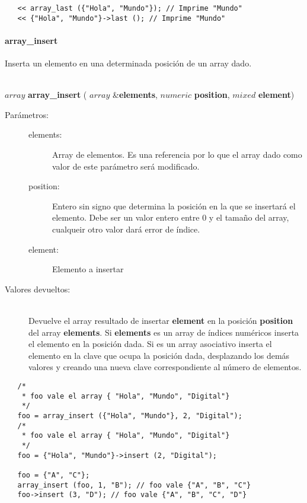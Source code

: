 \begin{lstlisting}   
   << array_last ({"Hola", "Mundo"}); // Imprime "Mundo"
   << {"Hola", "Mundo"}->last (); // Imprime "Mundo"
\end{lstlisting}

\paragraph{array\_insert}
Inserta un elemento en una determinada posición de un array dado.

\begin{framed}
\hfill \\ $array$ \textbf{array\_insert} ( $array$ \&\textbf{elements}, $numeric$ \textbf{position}, $mixed$ \textbf{element})  
\begin{description}
\item [Parámetros:] \hfill 
   \begin{description}
   \item[elements:] Array de elementos. Es una referencia por lo que el array dado como valor de este parámetro será modificado. 
   \item[position:] Entero sin signo que determina la posición en la que se insertará el elemento. Debe ser un valor entero entre $0$ y
   el tamaño del array, cualqueir otro valor dará error de índice.
   \item[element:] Elemento a insertar
   \end{description}
\item[Valores devueltos:] \hfill \\
   Devuelve el array resultado de insertar \textbf{element} en la posición \textbf{position} del array \textbf{elements}.
   Si \textbf{elements} es un array de índices numéricos inserta el elemento en la posición dada. Si 
   es un array asociativo inserta el elemento en la clave que ocupa la posición dada, desplazando los demás valores y creando
   una nueva clave correspondiente al número de elementos.
\end{description}
\end{framed}
     
\begin{lstlisting}   
   /*
    * foo vale el array { "Hola", "Mundo", "Digital"}
    */
   foo = array_insert ({"Hola", "Mundo"}, 2, "Digital"); 
   /*
    * foo vale el array { "Hola", "Mundo", "Digital"}
    */
   foo = {"Hola", "Mundo"}->insert (2, "Digital");
   
   foo = {"A", "C"};
   array_insert (foo, 1, "B"); // foo vale {"A", "B", "C"}
   foo->insert (3, "D"); // foo vale {"A", "B", "C", "D"}
\end{lstlisting}

